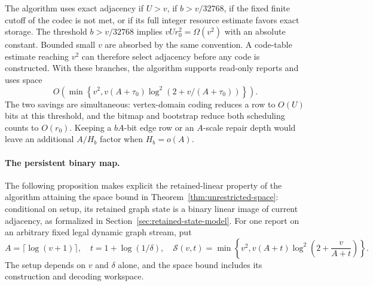 \documentclass[11pt,letterpaper]{article}
\numberwithin{equation}{section}
\begin{document}
The algorithm uses exact adjacency if $U>v$, if $b>v/32768$, if the fixed finite cutoff of the codec is not met, or if its full integer resource estimate favors exact storage.
The threshold $b>v/32768$ implies $vUr_0^2=\Omega(v^2)$ with an absolute constant.
Bounded small $v$ are absorbed by the same convention.
A code-table estimate reaching $v^2$ can therefore select adjacency before any code is constructed.
With these branches, the algorithm supports read-only reports and uses space
\begin{equation}
O\!\left(\min\left\{v^2,
     v(A+\tau_0)\log^2(2+v/(A+\tau_0))\right\}\right).
 \label{eq:vc2}
\end{equation}
The two savings are simultaneous: vertex-domain coding reduces a row to $O(U)$ bits at this threshold, and the bitmap and bootstrap reduce both scheduling counts to $O(r_0)$.
Keeping a $bA$-bit edge row or an $A$-scale repair depth would leave an additional $A/H_b$ factor when $H_b=o(A)$.

\paragraph{The persistent binary map.}
\label{sec:fully-dynamic-single-field-linear}
The following proposition makes explicit the retained-linear property of the algorithm attaining the space bound in Theorem~\ref{thm:unrestricted-space}: conditional on setup, its retained graph state is a binary linear image of current adjacency, as formalized in Section~\ref{sec:retained-state-model}.
For one report on an arbitrary fixed legal dynamic graph stream, put
\begin{equation}
A=\lceil\log(v+1)\rceil,\quad t=1+\log(1/\delta),\quad
 \mathcal S(v,t)=\min\left\{v^2,
 v(A+t)\log^2\left(2+\frac{v}{A+t}\right)\right\}.
 \label{eq:lf1}
\end{equation}
The setup depends on $v$ and $\delta$ alone, and the space bound includes its construction and decoding workspace.
\end{document}
